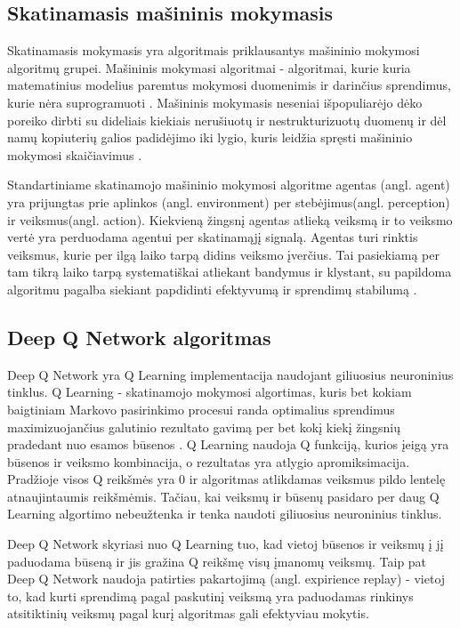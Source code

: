 \documentclass{VUMIFPSbakalaurinis}
\begin{document}
\subsection{Skatinamasis mašininis mokymasis}
Skatinamasis mokymasis yra algoritmais priklausantys mašininio mokymosi algoritmų grupei. Mašininis mokymasi algoritmai - algoritmai, kurie kuria matematinius modelius paremtus mokymosi duomenimis ir darinčius sprendimus, kurie nėra suprogramuoti \cite{bishoppattern}. Mašininis mokymasis neseniai išpopuliarėjo dėko poreiko dirbti su dideliais kiekiais nerušiuotų ir nestrukturizuotų duomenų ir dėl namų kopiuterių galios padidėjimo iki lygio, kuris leidžia spręsti mašininio mokymosi skaičiavimus \cite{whypopular}.   

Standartiniame skatinamojo mašininio mokymosi algoritme agentas (angl. agent) yra prijungtas prie aplinkos (angl. environment) per stebėjimus(angl. perception) ir veiksmus(angl. action). Kiekvieną žingsnį agentas atlieką veiksmą ir to veiksmo vertė yra perduodama agentui per skatinamąjį signalą. Agentas turi rinktis veiksmus, kurie per ilgą laiko tarpą didins veiksmo įverčius. Tai pasiekiamą per tam tikrą laiko tarpą systematiškai atliekant bandymus ir klystant, su papildoma algoritmu pagalba siekiant papdidinti efektyvumą ir sprendimų stabilumą \cite{reinf}.     

\subsection{Deep Q Network algoritmas}
Deep Q Network yra Q Learning implementacija naudojant giliuosius neuroninius tinklus. Q Learning - skatinamojo mokymosi algortimas, kuris bet kokiam baigtiniam Markovo pasirinkimo procesui randa optimalius sprendimus maximizuojančius galutinio rezultato gavimą per bet kokį kiekį žingsnių pradedant nuo esamos būsenos \cite{melo2001convergence}. 
Q Learning naudoja Q funkciją, kurios įeigą yra būsenos ir veiksmo kombinacija, o rezultatas yra atlygio apromiksimacija. Pradžioje visos Q reikšmės yra 0 ir algoritmas atlikdamas veiksmus pildo lentelę atnaujintaumis reikšmėmis. Tačiau, kai veiksmų ir būsenų pasidaro per daug Q Learning algortimo nebeužtenka ir tenka naudoti giliuosius neuroninius tinklus.  

Deep Q Network skyriasi nuo Q Learning tuo, kad vietoj būsenos ir veiksmų į jį paduodama būseną ir jis gražina Q reikšmę visų įmanomų veiksmų. Taip pat Deep Q Network naudoja patirties pakartojimą (angl. expirience replay) - vietoj to, kad kurti sprendimą pagal paskutinį veiksmą yra paduodamas rinkinys atsitiktinių veiksmų pagal kurį algoritmas gali efektyviau mokytis. 
\end{document}
